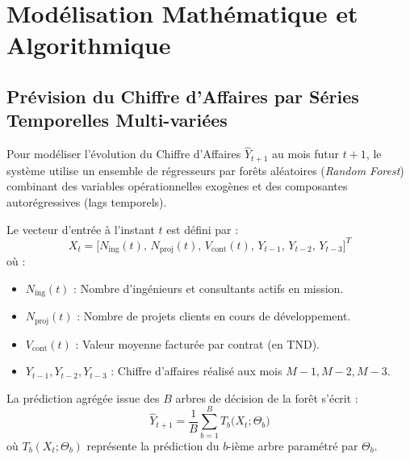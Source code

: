 \documentclass[11pt,a4paper,oneside]{report}
\begin{document}
\section{Modélisation Mathématique et Algorithmique}

\subsection{Prévision du Chiffre d'Affaires par Séries Temporelles Multi-variées}
Pour modéliser l'évolution du Chiffre d'Affaires $\hat{Y}_{t+1}$ au mois futur $t+1$, le système utilise un ensemble de régresseurs par forêts aléatoires (\textit{Random Forest}) combinant des variables opérationnelles exogènes et des composantes autorégressives (lags temporels).

Le vecteur d'entrée à l'instant $t$ est défini par :
\begin{equation}
    X_t = \Big[ N_{\text{ing}}(t), \, N_{\text{proj}}(t), \, V_{\text{cont}}(t), \, Y_{t-1}, \, Y_{t-2}, \, Y_{t-3} \Big]^T
\end{equation}
où :
\begin{itemize}[nosep]
    \item $N_{\text{ing}}(t)$ : Nombre d'ingénieurs et consultants actifs en mission.
    \item $N_{\text{proj}}(t)$ : Nombre de projets clients en cours de développement.
    \item $V_{\text{cont}}(t)$ : Valeur moyenne facturée par contrat (en TND).
    \item $Y_{t-1}, Y_{t-2}, Y_{t-3}$ : Chiffre d'affaires réalisé aux mois $M-1, M-2, M-3$.
\end{itemize}

La prédiction agrégée issue des $B$ arbres de décision de la forêt s'écrit :
\begin{equation}
    \hat{Y}_{t+1} = \frac{1}{B} \sum_{b=1}^{B} T_b\Big(X_t ; \Theta_b\Big)
\end{equation}
où $T_b(X_t ; \Theta_b)$ représente la prédiction du $b$-ième arbre paramétré par $\Theta_b$.
\end{document}
